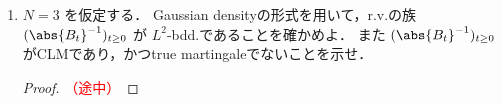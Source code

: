 \documentclass{jsarticle}
\begin{document}
\begin{enumerate}
\begin{proof}
        4.の結果より $\abs{B}^{2-N}$ は非負CLMなので，Prop. 4.7(i)より$\abs{B}^{2-N}$ は非負supermartingale.
        ゆえに任意の $t\ge0$ に対し
        $$
        E[\abs{B_t}^{2-N}]
        \le E[\abs{B_0}^{2-N}]
        = \abs{x}^{2-N}
        $$
        が成り立つので，$\sup_{t\ge0}E[\abs{B_t}^{2-N}]<\infty$ より $\abs{B}^{2-N}$ は $L^1$-bdd.
        よってThm. 3.19より $\abs{B_{\infty}}^{2-N}$ がa.s.で存在するので，$\lim_{t\to\infty}\abs{B_t}$ がa.s.で存在する．
        a.s.で $\limsup_{t\to\infty}B_t^1=\infty$ となるので，a.s.で $\lim_{t\to\infty}\abs{B_t}=\infty.$
    \end{proof}
    
    \item
    $N=3$ を仮定する．
    Gaussian densityの形式を用いて，r.v.の族 $(\abs{B_t}^{-1})_{t\ge0}$ が $L^2$-bdd.であることを確かめよ．
    また $(\abs{B_t}^{-1})_{t\ge0}$ がCLMであり，かつtrue martingaleでないことを示せ．
    \begin{proof}\textcolor{red}{（途中）}
        
    \end{proof}
\end{enumerate}
\end{document}
